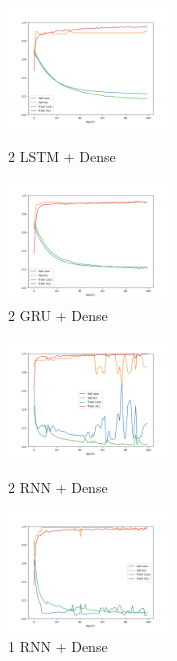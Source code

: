 \documentclass[conference]{IEEEtran}
\begin{document}
\begin{figure}[H]
  \centering
  \begin{minipage}[b]{4.25cm}
    \includegraphics[width=4.25cm]{2lstm}
    \caption{2 LSTM + Dense}
    \label{fig:2lstm}
  \end{minipage}
  \hfill
  \begin{minipage}[b]{4.25cm}
    \includegraphics[width=4.25cm]{2gru}
    \caption{2 GRU + Dense}
    \label{fig:2gru}
  \end{minipage}
\end{figure}

\begin{figure}[H]
  \centering
  \begin{minipage}[b]{4.25cm}
    \includegraphics[width=4.25cm]{2rnn}
    \caption{2 RNN + Dense}
    \label{fig:2rnn}
  \end{minipage}
  \hfill
  \begin{minipage}[b]{4.25cm}
    \includegraphics[width=4.25cm]{1rnn}
    \caption{1 RNN + Dense}
    \label{fig:1rnn}
  \end{minipage}
\end{figure}
\end{document}
